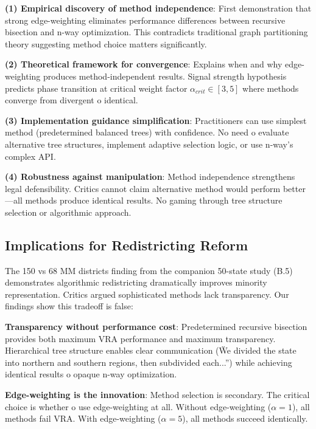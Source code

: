 \textbf{(1) Empirical discovery of method independence}: First demonstration that strong edge-weighting eliminates performance differences between recursive bisection and n-way optimization. This contradicts traditional graph partitioning theory suggesting method choice matters significantly.

\textbf{(2) Theoretical framework for convergence}: Explains when and why edge-weighting produces method-independent results. Signal strength hypothesis predicts phase transition at critical weight factor $\alpha_{crit} \in [3,5]$ where methods converge from divergent 	o identical.

\textbf{(3) Implementation guidance simplification}: Practitioners can use simplest method (predetermined balanced trees) with confidence. No need 	o evaluate alternative tree structures, implement adaptive selection logic, or use n-way's complex API.

\textbf{(4) Robustness against manipulation}: Method independence strengthens legal defensibility. Critics cannot claim alternative method would perform better—all methods produce identical results. No gaming through tree structure selection or algorithmic approach.

\subsection{Implications for Redistricting Reform}

The 150 vs 68 MM districts finding from the companion 50-state study (B.5) \citep{dellaLibera2026nwayRecursive} demonstrates algorithmic redistricting dramatically improves minority representation. Critics argued sophisticated methods lack transparency. Our findings show this tradeoff is false:

\textbf{Transparency without performance cost}: Predetermined recursive bisection provides both maximum VRA performance and maximum transparency. Hierarchical tree structure enables clear communication (\"We divided the state into northern and southern regions, then subdivided each...'') while achieving identical results 	o opaque n-way optimization.

\textbf{Edge-weighting is the innovation}: Method selection is secondary. The critical choice is whether 	o use edge-weighting at all. Without edge-weighting ($\alpha = 1$), all methods fail VRA. With edge-weighting ($\alpha = 5$), all methods succeed identically.

